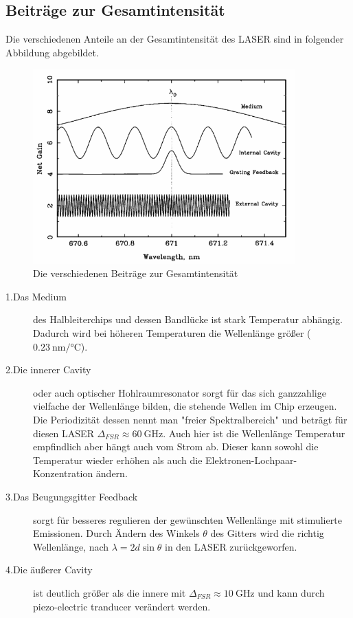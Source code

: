 \newpage
\subsection{Beiträge zur Gesamtintensität}
Die verschiedenen Anteile an der Gesamtintensität des LASER sind in folgender Abbildung abgebildet. 

\begin{figure}[H]
    \centering
    \includegraphics[width=0.9\textwidth]{Bilder/LASER_Moden.png} 
    \caption{Die verschiedenen Beiträge zur Gesamtintensität \cite{bk:LASER}}
    \label{fig:Moden}
\end{figure}

\begin{description}
    \item[1.Das Medium] des Halbleiterchips und dessen Bandlücke ist stark Temperatur abhängig. 
    Dadurch wird bei höheren Temperaturen die Wellenlänge größer ($\qty{0.23}{\nano\meter\per\celsius}$). 
    \item[2.Die innerer Cavity] oder auch optischer Hohlraumresonator sorgt für das sich ganzzahlige vielfache der Wellenlänge bilden, die stehende Wellen im Chip erzeugen. 
    Die Periodizität dessen nennt man "freier Spektralbereich" und beträgt für diesen LASER $\Delta_{FSR} \approx  \qty{60}{\giga\hertz}$. 
    Auch hier ist die Wellenlänge Temperatur empfindlich aber hängt auch vom Strom ab. 
    Dieser kann sowohl die Temperatur wieder erhöhen als auch die Elektronen-Lochpaar-Konzentration ändern. 
    \item[3.Das Beugungsgitter Feedback] sorgt für besseres regulieren der gewünschten Wellenlänge mit stimulierte Emissionen. 
    Durch Ändern des Winkels $\theta $ des Gitters wird die richtig Wellenlänge, nach $\lambda =2d \sin\theta $ in den LASER zurückgeworfen. 
    \item[4.Die äußerer Cavity] ist deutlich größer als die innere mit $\Delta_{FSR} \approx  \qty{10}{\giga\hertz}$ und kann durch piezo-electric tranducer verändert werden. 
\end{description}

